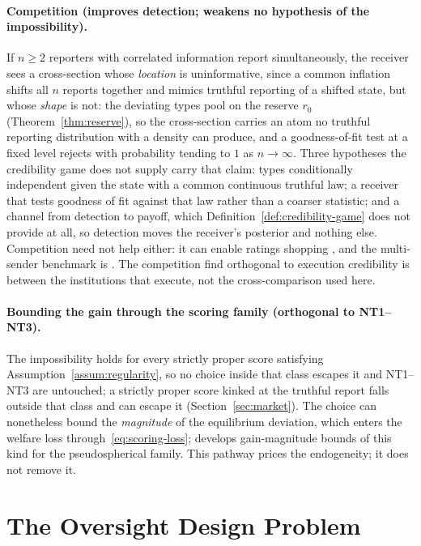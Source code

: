 \documentclass[acmsmall,nonacm,screen]{acmart}
\theoremstyle{acmplain}%
\theoremstyle{acmdefinition}%
\numberwithin{equation}{section}
\begin{document}
\paragraph{Competition (improves detection; weakens no hypothesis of the impossibility).} If $n \geq 2$ reporters with correlated information report simultaneously, the receiver sees a cross-section whose \emph{location} is uninformative, since a common inflation shifts all $n$ reports together and mimics truthful reporting of a shifted state, but whose \emph{shape} is not: the deviating types pool on the reserve $r_0$ (Theorem~\ref{thm:reserve}), so the cross-section carries an atom no truthful reporting distribution with a density can produce, and a goodness-of-fit test at a fixed level rejects with probability tending to $1$ as $n \to \infty$. Three hypotheses the credibility game does not supply carry that claim: types conditionally independent given the state with a common continuous truthful law; a receiver that tests goodness of fit against that law rather than a coarser statistic; and a channel from detection to payoff, which Definition~\ref{def:credibility-game} does not provide at all, so detection moves the receiver's posterior and nothing else. Competition need not help either: it can enable ratings shopping \citep{skreta2009ratings,becker2011credit}, and the multi-sender benchmark is \citet{gentzkow2017competition}. The competition \citet{loven2026trilemma} find orthogonal to execution credibility is between the institutions that execute, not the cross-comparison used here.

\paragraph{Bounding the gain through the scoring family (orthogonal to NT1--NT3).} The impossibility holds for every strictly proper score satisfying Assumption~\ref{assum:regularity}, so no choice inside that class escapes it and NT1--NT3 are untouched; a strictly proper score kinked at the truthful report falls outside that class and can escape it (Section~\ref{sec:market}). The choice can nonetheless bound the \emph{magnitude} of the equilibrium deviation, which enters the welfare loss through~\eqref{eq:scoring-loss}; \citet{loven2026honestreporting} develops gain-magnitude bounds of this kind for the pseudospherical family. This pathway prices the endogeneity; it does not remove it.

\section{The Oversight Design Problem}\label{sec:behavioral}
\end{document}
